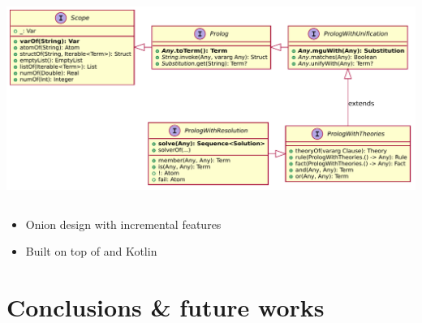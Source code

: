 \documentclass[presentation]{beamer}
\begin{document}
\begin{frame}
\begin{columns}
\begin{column}{.84\linewidth}
            \includegraphics[width=\linewidth]{img/dsl-types}
        \end{column}
    \end{columns}

    \vfill

    \begin{itemize}
        \item Onion design with incremental features
        \item Built on top of \twopkt{} and Kotlin
    \end{itemize}

\end{frame}

\section{Conclusions \& future works}
\end{document}
